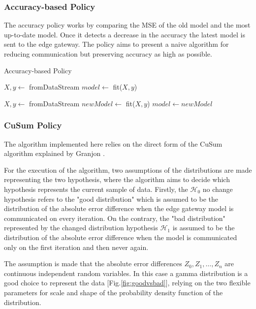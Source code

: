 \documentclass{mpaper}
\begin{document}
\subsubsection{Accuracy-based Policy}
The accuracy policy works by comparing the MSE of the old model and the most up-to-date model. Once it detects a decrease in the accuracy the latest model is sent to the edge gateway.
The policy aims to present a naive algorithm for reducing communication but preserving accuracy as high as possible.

\begin{algorithm}[h]
\caption{Accuracy-based Policy}\label{polA}
\begin{algorithmic}
\State $X, y \gets$ fromDataStream
\State $model \gets$ fit($X,y$)

    \State $X, y \gets$ fromDataStream
    \State $newModel \gets$ fit($X,y$)
        \State $model \gets newModel$ 
    \EndIf
\EndWhile
\end{algorithmic}
\end{algorithm}

\subsubsection{CuSum Policy}
The algorithm implemented here relies on the direct form of the CuSum algorithm explained by Granjon \cite{cusum_pierre}.

For the execution of the algorithm, two assumptions of the distributions are made representing the two hypothesis, where the algorithm aims to decide which hypothesis represents the current sample of data. 
Firstly, the $\mathcal{H}_0$ no change hypothesis refers to the "good distribution" which is assumed to be the distribution of the absolute error difference when the edge gateway model is communicated on every iteration. On the contrary, the "bad distribution" represented by the changed distribution hypothesis $\mathcal{H}_1$ is assumed to be the distribution of the absolute error difference when the model is communicated only on the first iteration and then never again.

The assumption is made that the absolute error differences $Z_0, Z_1, \dotsc , Z_n $ are continuous independent random variables. In this case a gamma distribution is a good choice to represent the data  [Fig.\ref{fig:goodvsbad}], relying on the two flexible parameters for scale and shape of the probability density function of the distribution.
\end{document}
